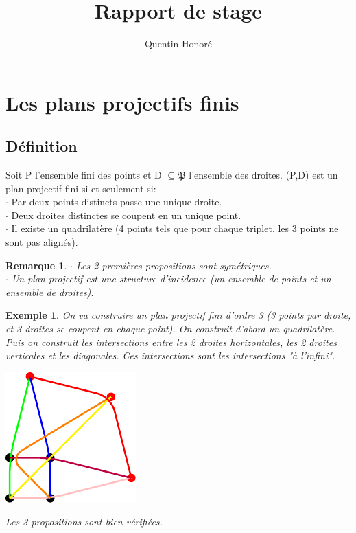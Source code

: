 \documentclass[a4paper]{article}
\title{Rapport de stage}
\newtheorem{Rem}{Remarque}[subsection]
\newtheorem{Ex}{Exemple}[subsection]
\begin{document}
\author{Quentin Honoré}
\date{}
\maketitle
\newpage
\tableofcontents
\newpage

\section{Les plans projectifs finis}
\subsection{Définition}
Soit P l'ensemble fini des points et D $ \subseteq \mathfrak{P} $ l'ensemble des droites.
(P,D) est un plan projectif fini si et seulement si: \\
$\cdot$ Par deux points distincts passe une unique droite. \\
$\cdot$ Deux droites distinctes se coupent en un unique point. \\
$\cdot$ Il existe un quadrilatère (4 points tels que pour chaque triplet, les 3 points ne sont pas alignés).

\begin{Rem}
  $\cdot$ Les 2 premières propositions sont symétriques. \\
  $\cdot$ Un plan projectif est une structure d'incidence (un ensemble de points et un ensemble de droites).
\end{Rem}
  
\begin{Ex}
  On va construire un plan projectif fini d'ordre 3 (3 points par droite, et 3 droites se coupent en chaque point). On construit d'abord un quadrilatère. Puis on construit les intersections entre les 2 droites horizontales, les 2 droites verticales et les diagonales. Ces intersections sont les intersections "à l'infini".
\begin{center}
\includegraphics{test_tikz.pdf}
\end{center}
Les 3 propositions sont bien vérifiées.
\end{Ex}
\end{document}
